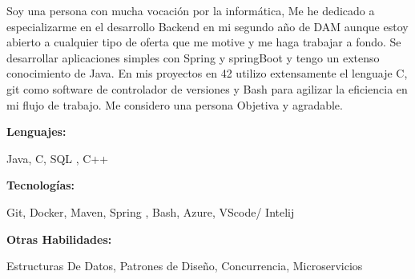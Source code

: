\documentclass[9pt]{developercv} %
\begin{document}
\begin{minipage}[t]{0.46\textwidth}
	\vspace{-6pt}
 
       Soy una persona con mucha vocación por la informática, Me he dedicado a especializarme en el desarrollo Backend en mi segundo año de DAM  aunque estoy abierto a cualquier tipo de oferta que me motive y me haga trabajar a fondo. Se desarrollar aplicaciones simples con Spring y springBoot y tengo un extenso conocimiento de Java. En mis proyectos en 42 utilizo extensamente el lenguaje C,  git como software de controlador de versiones y  Bash  para agilizar la eficiencia en mi flujo de trabajo. Me considero una persona Objetiva y agradable.     \\
\end{minipage}
\hfill %
\begin{minipage}[t]{0.465\textwidth}
    \vspace{-2pt}
    
    \begin{minipage}[t]{0.3\textwidth}
        \textbf{Lenguajes:}
    \end{minipage}
    \hfill
    \begin{minipage}[t]{0.73\textwidth}
      Java, C, SQL , C++
    \end{minipage}
    \vspace{4mm}
    
    \begin{minipage}[t]{0.3\textwidth}
        \textbf{Tecnologías:}
    \end{minipage}
    \hfill
    \begin{minipage}[t]{0.73\textwidth}
      Git,  Docker, Maven, Spring , Bash, Azure, VScode/ Intelij
    \end{minipage}
       \vspace{4mm}
    
        \begin{minipage}[t]{0.3\textwidth}
        \textbf{Otras \newline Habilidades:}
    \end{minipage}
    \hfill
    \begin{minipage}[t]{0.73\textwidth}
      Estructuras De Datos, Patrones de Diseño, Concurrencia, Microservicios 
    \end{minipage}
    
    
\end{minipage}
\end{document}
